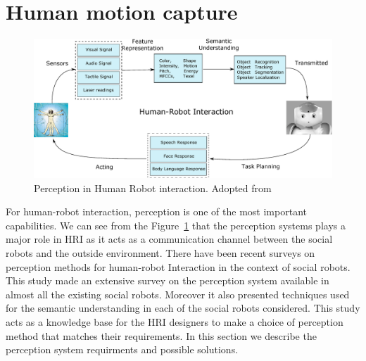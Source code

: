 \section{Human motion capture}
\label{sec:motion_capture}
\begin{figure}
\centering
\includegraphics[width=1\textwidth]{assets/hri_perception.eps}
\caption[Perception in Human Robot interaction]{Perception in Human Robot interaction. {Adopted from \cite{Yan2014}}}
\label{fig:hri_perception}
\end{figure}
	For human-robot interaction, perception is one of the most important capabilities. We can see from the Figure~\ref{fig:hri_perception} that the perception systems plays a major role in HRI as it acts as a communication channel between the social robots and the outside environment. There have been recent surveys on perception methods for human-robot Interaction in the context of social robots\cite{Yan2014}. This study made an extensive survey on the perception system available in almost all the existing social robots. Moreover it also presented techniques used for the semantic understanding in each of the social robots considered. This study acts as a knowledge base for the HRI designers to make a choice of perception method that matches their requirements. In this section we describe the perception system requirments and possible solutions.
